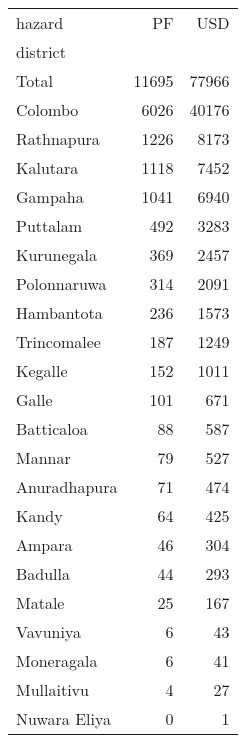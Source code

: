 \begin{tabular}{lrr}
\toprule
hazard &     PF &    USD \\
district     &        &        \\
\midrule
Total        &  11695 &  77966 \\
Colombo      &   6026 &  40176 \\
Rathnapura   &   1226 &   8173 \\
Kalutara     &   1118 &   7452 \\
Gampaha      &   1041 &   6940 \\
Puttalam     &    492 &   3283 \\
Kurunegala   &    369 &   2457 \\
Polonnaruwa  &    314 &   2091 \\
Hambantota   &    236 &   1573 \\
Trincomalee  &    187 &   1249 \\
Kegalle      &    152 &   1011 \\
Galle        &    101 &    671 \\
Batticaloa   &     88 &    587 \\
Mannar       &     79 &    527 \\
Anuradhapura &     71 &    474 \\
Kandy        &     64 &    425 \\
Ampara       &     46 &    304 \\
Badulla      &     44 &    293 \\
Matale       &     25 &    167 \\
Vavuniya     &      6 &     43 \\
Moneragala   &      6 &     41 \\
Mullaitivu   &      4 &     27 \\
Nuwara Eliya &      0 &      1 \\
\bottomrule
\end{tabular}
